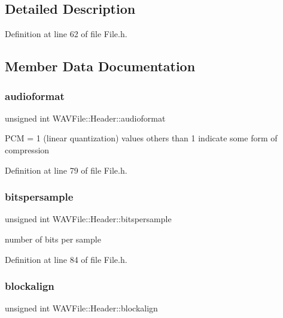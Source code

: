 \subsection{Detailed Description}


Definition at line 62 of file File.\+h.



\subsection{Member Data Documentation}
\mbox{\label{struct_w_a_v_file_1_1_header_a6d16652e388f953230b0275301c87d2f}} 
\subsubsection{\texorpdfstring{audioformat}{audioformat}}
{\footnotesize\ttfamily unsigned int W\+A\+V\+File\+::\+Header\+::audioformat}

P\+CM = 1 (linear quantization) values others than 1 indicate some form of compression 

Definition at line 79 of file File.\+h.

\mbox{\label{struct_w_a_v_file_1_1_header_ad731c9ced0b22903be0b24f6528ec061}} 
\subsubsection{\texorpdfstring{bitspersample}{bitspersample}}
{\footnotesize\ttfamily unsigned int W\+A\+V\+File\+::\+Header\+::bitspersample}

number of bits per sample 

Definition at line 84 of file File.\+h.

\mbox{\label{struct_w_a_v_file_1_1_header_a5c212f5f08c59f8487ccc3d066753892}} 
\subsubsection{\texorpdfstring{blockalign}{blockalign}}
{\footnotesize\ttfamily unsigned int W\+A\+V\+File\+::\+Header\+::blockalign}

